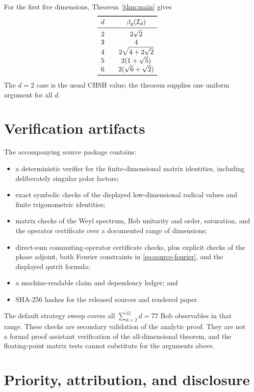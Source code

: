 \documentclass[11pt]{article}
\theoremstyle{remark}
\newcommand{\cI}{\mathcal I}
\begin{document}
For the first five dimensions, Theorem~\ref{thm:main} gives
\[
\begin{array}{c@{\qquad}c}
\toprule
d&\beta_q(\cI_d)\\
\midrule
2&2\sqrt2\\
3&4\\
4&2\sqrt{4+2\sqrt2}\\
5&2(1+\sqrt5)\\
6&2(\sqrt6+\sqrt2)\\
\bottomrule
\end{array}
\]
The \(d=2\) case is the usual CHSH value; the theorem supplies one uniform
argument for all \(d\).

\section{Verification artifacts}

The accompanying source package contains:
\begin{itemize}[leftmargin=1.5em]
  \item a deterministic verifier for the finite-dimensional matrix identities,
        including deliberately singular polar factors;
  \item exact symbolic checks of the displayed low-dimensional radical values
        and finite trigonometric identities;
  \item matrix checks of the Weyl spectrum, Bob unitarity and order,
        saturation, and the operator certificate over a documented range of
        dimensions;
  \item direct-sum commuting-operator certificate checks, plus explicit
        checks of the phase adjoint, both Fourier constraints in
        \eqref{eq:source-fourier}, and the displayed qutrit formula;
  \item a machine-readable claim and dependency ledger; and
  \item SHA-256 hashes for the released sources and rendered paper.
\end{itemize}
The default strategy sweep covers all
\(
\sum_{d=2}^{12}d=77
\)
Bob observables in that range.
These checks are secondary validation of the analytic proof.  They are not a
formal proof assistant verification of the all-dimensional theorem, and the
floating-point matrix tests cannot substitute for the arguments above.

\section*{Priority, attribution, and disclosure}
\end{document}
